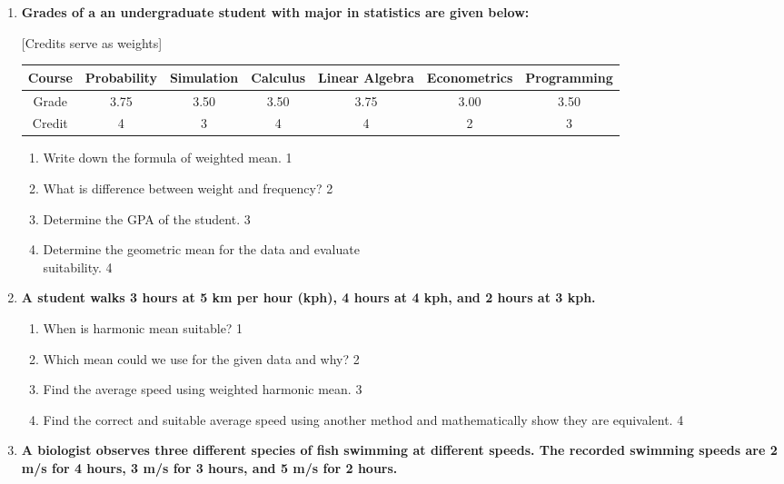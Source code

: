 \documentclass[a4paper,oneside]{book}
\begin{document}
\begin{enumerate}
   \item
	  \textbf{Grades of a an undergraduate student with major in statistics are given below: } 
	  
	  [Credits serve as weights]

\begin{table}[h]
\centering
\begin{tabular}{c|c|c|c|c|c|c}
\hline
Course & Probability & Simulation & Calculus & Linear Algebra & Econometrics & Programming \\ \hline
Grade & 3.75 & 3.50 & 3.50 & 3.75 & 3.00 & 3.50 \\  \hline
Credit & 4 & 3 & 4 & 4 & 2 & 3 \\ \hline
\end{tabular}
\end{table}


  
  \begin{enumerate}
    \item
	Write down the formula of weighted mean. \hfill 1
    \item
	What is difference between weight and frequency? \hfill 2
    \item  
	Determine the GPA of the student. \hfill 3
    \item
	Determine the geometric mean for the data and evaluate \\ suitability. \hfill 4
  \end{enumerate}

 \item
	  \textbf{A student walks 3 hours at 5 km per hour (kph), 4 hours at 4 kph, and 2 hours at 3 kph.} 
  
  \begin{enumerate}
    \item
	When is harmonic mean suitable? \hfill 1
    \item
	Which mean could we use for the given data and why? \hfill 2
    \item  
	Find the average speed using weighted harmonic mean. \hfill 3
    \item
	Find the correct and suitable average speed using another method and mathematically show they are equivalent. \hfill 4
  \end{enumerate}
  
  \item
\textbf{A biologist observes three different species of fish swimming at 
different speeds. The recorded swimming speeds are 2 m/s for 4 hours, 
3 m/s for 3 hours, and 5 m/s for 2 hours.}


\end{enumerate}
\end{document}
